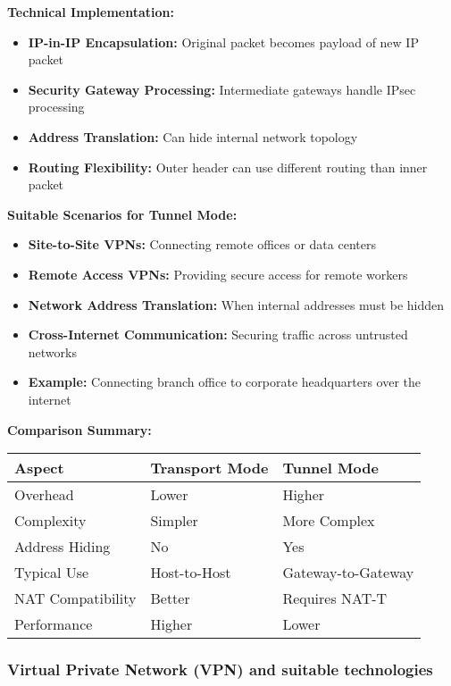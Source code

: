 \documentclass[12pt,a4paper]{article}
\begin{document}
\textbf{Technical Implementation:}
\begin{itemize}
    \item \textbf{IP-in-IP Encapsulation:} Original packet becomes payload of new IP packet
    \item \textbf{Security Gateway Processing:} Intermediate gateways handle IPsec processing
    \item \textbf{Address Translation:} Can hide internal network topology
    \item \textbf{Routing Flexibility:} Outer header can use different routing than inner packet
\end{itemize}

\textbf{Suitable Scenarios for Tunnel Mode:}
\begin{itemize}
    \item \textbf{Site-to-Site VPNs:} Connecting remote offices or data centers
    \item \textbf{Remote Access VPNs:} Providing secure access for remote workers
    \item \textbf{Network Address Translation:} When internal addresses must be hidden
    \item \textbf{Cross-Internet Communication:} Securing traffic across untrusted networks
    \item \textbf{Example:} Connecting branch office to corporate headquarters over the internet
\end{itemize}

\textbf{Comparison Summary:}

\begin{center}
\begin{tabular}{|l|l|l|}
\hline
\textbf{Aspect} & \textbf{Transport Mode} & \textbf{Tunnel Mode} \\
\hline
Overhead & Lower & Higher \\
\hline
Complexity & Simpler & More Complex \\
\hline
Address Hiding & No & Yes \\
\hline
Typical Use & Host-to-Host & Gateway-to-Gateway \\
\hline
NAT Compatibility & Better & Requires NAT-T \\
\hline
Performance & Higher & Lower \\
\hline
\end{tabular}
\end{center}

\subsubsection{Virtual Private Network (VPN) and suitable technologies}
\end{document}
